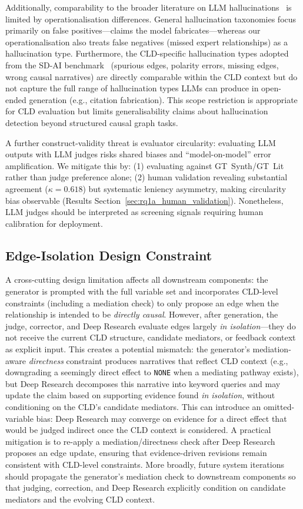 Additionally, comparability to the broader literature on LLM hallucinations~\citep{ji2023survey} is limited by operationalisation differences. General hallucination taxonomies focus primarily on false positives---claims the model fabricates---whereas our operationalisation also treats false negatives (missed expert relationships) as a hallucination type. Furthermore, the CLD-specific hallucination types adopted from the SD-AI benchmark~\citep{schoenberg2025aibuildsdmodels} (spurious edges, polarity errors, missing edges, wrong causal narratives) are directly comparable within the CLD context but do not capture the full range of hallucination types LLMs can produce in open-ended generation (e.g., citation fabrication). This scope restriction is appropriate for CLD evaluation but limits generalisability claims about hallucination detection beyond structured causal graph tasks.

A further construct-validity threat is evaluator circularity: evaluating LLM outputs with LLM judges risks shared biases and ``model-on-model'' error amplification. We mitigate this by: (1) evaluating against GT~Synth/GT~Lit rather than judge preference alone; (2) human validation revealing substantial agreement ($\kappa = 0.618$) but systematic leniency asymmetry, making circularity bias observable (Results Section~\ref{sec:rq1a_human_validation}). Nonetheless, LLM judges should be interpreted as screening signals requiring human calibration for deployment.

\subsection{Edge-Isolation Design Constraint}

A cross-cutting design limitation affects all downstream components: the generator is prompted with the full variable set and incorporates CLD-level constraints (including a mediation check) to only propose an edge when the relationship is intended to be \textit{directly causal}. However, after generation, the judge, corrector, and Deep Research evaluate edges largely \textit{in isolation}---they do not receive the current CLD structure, candidate mediators, or feedback context as explicit input. This creates a potential mismatch: the generator's mediation-aware \emph{directness} constraint produces narratives that reflect CLD context (e.g., downgrading a seemingly direct effect to \texttt{NONE} when a mediating pathway exists), but Deep Research decomposes this narrative into keyword queries and may update the claim based on supporting evidence found \emph{in isolation}, without conditioning on the CLD's candidate mediators. This can introduce an omitted-variable bias: Deep Research may converge on evidence for a direct effect that would be judged indirect once the CLD context is considered. A practical mitigation is to re-apply a mediation/directness check after Deep Research proposes an edge update, ensuring that evidence-driven revisions remain consistent with CLD-level constraints. More broadly, future system iterations should propagate the generator's mediation check to downstream components so that judging, correction, and Deep Research explicitly condition on candidate mediators and the evolving CLD context.

